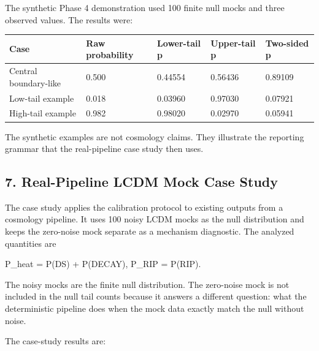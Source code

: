 \documentclass[
]{article}
\newenvironment{Shaded}{}{}
\newcommand{\NormalTok}[1]{#1}
\newcounter{none} %
\begin{document}
The synthetic Phase 4 demonstration used 100 finite null mocks and three
observed values. The results were:

{\def\LTcaptype{none} %
\begin{longtable}[]{@{}lllll@{}}
\toprule\noalign{}
Case & Raw probability & Lower-tail p & Upper-tail p & Two-sided p \\
\midrule\noalign{}
\endhead
\bottomrule\noalign{}
\endlastfoot
Central boundary-like & 0.500 & 0.44554 & 0.56436 & 0.89109 \\
Low-tail example & 0.018 & 0.03960 & 0.97030 & 0.07921 \\
High-tail example & 0.982 & 0.98020 & 0.02970 & 0.05941 \\
\end{longtable}
}

The synthetic examples are not cosmology claims. They illustrate the
reporting grammar that the real-pipeline case study then uses.

\subsection{7. Real-Pipeline LCDM Mock Case
Study}\label{real-pipeline-lcdm-mock-case-study}

The case study applies the calibration protocol to existing outputs from
a cosmology pipeline. It uses 100 noisy LCDM mocks as the null
distribution and keeps the zero-noise mock separate as a mechanism
diagnostic. The analyzed quantities are

\begin{Shaded}
\begin{Highlighting}[]
\NormalTok{P\_heat = P(DS) + P(DECAY),}
\NormalTok{P\_RIP  = P(RIP).}
\end{Highlighting}
\end{Shaded}

The noisy mocks are the finite null distribution. The zero-noise mock is
not included in the null tail counts because it answers a different
question: what the deterministic pipeline does when the mock data
exactly match the null without noise.

The case-study results are:
\end{document}

